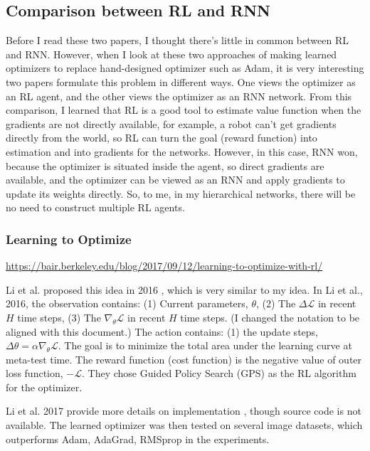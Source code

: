 \subsection{Comparison between RL and RNN}
Before I read these two papers, I thought there's little in common between RL and RNN.
However, when I look at these two approaches of making learned optimizers to replace hand-designed optimizer such as Adam, it is very interesting two papers formulate this problem in different ways.
One views the optimizer as an RL agent, and the other views the optimizer as an RNN network.
From this comparison, I learned that RL is a good tool to estimate value function when the gradients are not directly available, for example, a robot can't get gradients directly from the world, so RL can turn the goal (reward function) into estimation and into gradients for the networks.
However, in this case, RNN won, because the optimizer is situated inside the agent, so direct gradients are available, and the optimizer can be viewed as an RNN and apply gradients to update its weights directly.
So, to me, in my hierarchical networks, there will be no need to construct multiple RL agents.

\subsubsection{Learning to Optimize}
\href{https://bair.berkeley.edu/blog/2017/09/12/learning-to-optimize-with-rl/}{https://bair.berkeley.edu/blog/2017/09/12/learning-to-optimize-with-rl/}

Li et al. proposed this idea in 2016 \cite{li2016learning}, which is very similar to my idea.
In Li et al., 2016, the observation contains: (1) Current parameters, $\theta$, (2) The $\Delta \mathcal{L}$ in recent $H$ time steps, (3) The $\nabla_{\theta} \mathcal{L}$ in recent $H$ time steps. (I changed the notation to be aligned with this document.)
The action contains: (1) the update steps, $\Delta \theta = \alpha \nabla_{\theta} \mathcal{L}$.
The goal is to minimize the total area under the learning curve at meta-test time.
The reward function (cost function) is the negative value of outer loss function, $- \mathcal{L}$.
They chose Guided Policy Search (GPS) as the RL algorithm for the optimizer.

Li et al. 2017 provide more details on implementation \cite{li2017learning}, though source code is not available.
The learned optimizer was then tested on several image datasets, which outperforms Adam, AdaGrad, RMSprop in the experiments.

